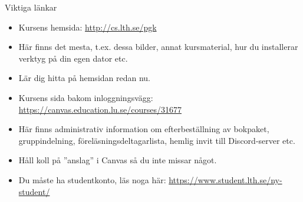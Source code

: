 \begin{SlideExtra}{Viktiga länkar}
  \begin{itemize}
    \item Kursens  hemsida: \url{http://cs.lth.se/pgk}
    \item[] Här finns det mesta, t.ex. dessa bilder, annat kursmaterial, hur du installerar verktyg på din egen dator etc.
    \item[] Lär dig hitta på hemsidan redan nu.
    \item Kursens  sida bakom inloggningsvägg: \url{https://canvas.education.lu.se/courses/31677}
    \item[] Här finns administrativ information om efterbeställning av bokpaket, gruppindelning, föreläsningsdeltagarlista, hemlig invit till Discord-server etc. 
    \item[] Håll koll på ''anslag'' i Canvas så du inte missar något.  
    \item[] Du måste ha studentkonto, läs noga här: \url{https://www.student.lth.se/ny-student/} 
  \end{itemize}
\end{SlideExtra}

\fi


